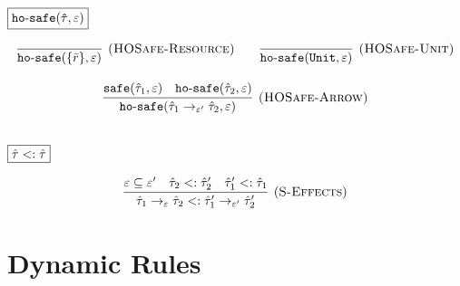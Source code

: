 \documentclass{llncs}
\newcommand{\keywadj}[1]{\mathtt{#1}}
\newcommand{\kwa}[1]{\keywadj{ #1 }}
\newcommand{\hyphen}{\hbox{-}}
\begin{document}
\noindent
$\fbox{$\kwa{ho \hyphen safe(\hat \tau, \varepsilon)}$}$

\[
\begin{array}{c}

\infer[\textsc{(HOSafe-Resource)}]
	{ \kwa{ho \hyphen safe}( \{ \bar r \}, \varepsilon)} 
	{}
	~~~~~~
\infer[\textsc{(HOSafe-Unit)}]
	{ \kwa{ho \hyphen safe}( \kwa{Unit}, \varepsilon)} 
	{}\\[3ex]

\infer[\textsc{(HOSafe-Arrow)}]
	{ \kwa{ho \hyphen safe}( \hat \tau_1 \rightarrow_{\varepsilon'} \hat \tau_2, \varepsilon ) }
	{ \kwa{safe}(\hat \tau_1, \varepsilon)  & \kwa{ho \hyphen safe}(\hat \tau_2, \varepsilon) }\\[3ex]

\end{array}
\]

\noindent
$\fbox{$\hat \tau <: \hat \tau$}$

\[
\begin{array}{c}

\infer[(\textsc{S-Effects})]
	{\hat \tau_1 \rightarrow_{\varepsilon} \hat \tau_2 <: \hat \tau_1' \rightarrow_{\varepsilon'} \hat \tau_2'}
	{\varepsilon \subseteq \varepsilon' & \hat \tau_2 <: \hat \tau_2' & \hat \tau_1' <: \hat \tau_1}

\end{array}
\]

\section{Dynamic Rules}

\noindent
{}
\end{document}
